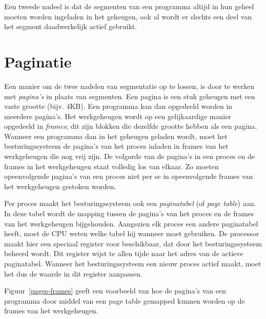 Een tweede nadeel is dat de segmenten van een programma altijd in hun geheel moeten worden ingeladen in het geheugen, ook al wordt er slechts een deel van het segment daadwerkelijk actief gebruikt.

\section{Paginatie}

Een manier om de twee nadelen van segmentatie op te lossen, is door te werken met \emph{pagina's} in plaats van segmenten. Een pagina is een stuk geheugen met een vaste grootte (bijv. 4KB). Een programma kan dan opgedeeld worden in meerdere pagina's. Het werkgeheugen wordt op een gelijkaardige manier opgedeeld in \emph{frames}; dit zijn blokken die dezelfde grootte hebben als een pagina. Wanneer een programma dan in het geheugen geladen wordt, moet het besturingssysteem de pagina's van het proces inladen in frames van het werkgeheugen die nog vrij zijn. De volgorde van de pagina's in een proces en de frames in het werkgeheugen staat volledig los van elkaar. Zo moeten opeenvolgende pagina's van een proces niet per se in opeenvolgende frames van het werkgeheugen gestoken worden.

Per proces maakt het besturingssysteem ook een \emph{paginatabel} (of \emph{page table}) aan. In deze tabel wordt de mapping tussen de pagina's van het proces en de frames van het werkgeheugen bijgehouden. Aangezien elk proces een andere paginatabel heeft, moet de CPU weten welke tabel hij wanneer moet gebruiken. De processor maakt hier een speciaal register voor beschikbaar, dat door het besturingssysteem beheerd wordt. Dit register wijst te allen tijde naar het adres van de actieve paginatabel. Wanneer het besturingssysteem een nieuw proces actief maakt, moet het dus de waarde in dit register aanpassen.

Figuur~\ref{pages-frames} geeft een voorbeeld van hoe de pagina's van een programma door middel van een page table gemapped kunnen worden op de frames van het werkgeheugen. 

